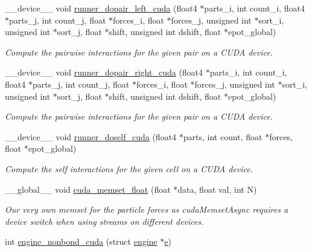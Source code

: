 \begin{DoxyCompactItemize}
\-\_\-\-\_\-device\-\_\-\-\_\- void \hyperlink{runner__cuda_8cu_ac0ad184f688f3a3b79c58f73f642b611}{runner\-\_\-dopair\-\_\-left\-\_\-cuda} (float4 $\ast$parts\-\_\-i, int count\-\_\-i, float4 $\ast$parts\-\_\-j, int count\-\_\-j, float $\ast$forces\-\_\-i, float $\ast$forces\-\_\-j, unsigned int $\ast$sort\-\_\-i, unsigned int $\ast$sort\-\_\-j, float $\ast$shift, unsigned int dshift, float $\ast$epot\-\_\-global)
\begin{DoxyCompactList}\small\item\em Compute the pairwise interactions for the given pair on a C\-U\-D\-A device. \end{DoxyCompactList}\item 
\-\_\-\-\_\-device\-\_\-\-\_\- void \hyperlink{runner__cuda_8cu_a3dd671b11851b775b5fef7b8ae178c9e}{runner\-\_\-dopair\-\_\-right\-\_\-cuda} (float4 $\ast$parts\-\_\-i, int count\-\_\-i, float4 $\ast$parts\-\_\-j, int count\-\_\-j, float $\ast$forces\-\_\-i, float $\ast$forces\-\_\-j, unsigned int $\ast$sort\-\_\-i, unsigned int $\ast$sort\-\_\-j, float $\ast$shift, unsigned int dshift, float $\ast$epot\-\_\-global)
\begin{DoxyCompactList}\small\item\em Compute the pairwise interactions for the given pair on a C\-U\-D\-A device. \end{DoxyCompactList}\item 
\-\_\-\-\_\-device\-\_\-\-\_\- void \hyperlink{runner__cuda_8cu_a1c924aa03f90fa43d741e4b95ac4f185}{runner\-\_\-doself\-\_\-cuda} (float4 $\ast$parts, int count, float $\ast$forces, float $\ast$epot\-\_\-global)
\begin{DoxyCompactList}\small\item\em Compute the self interactions for the given cell on a C\-U\-D\-A device. \end{DoxyCompactList}\item 
\-\_\-\-\_\-global\-\_\-\-\_\- void \hyperlink{runner__cuda_8cu_a3e3d193762e74ec5046ce21883c869ca}{cuda\-\_\-memset\-\_\-float} (float $\ast$data, float val, int N)
\begin{DoxyCompactList}\small\item\em Our very own memset for the particle forces as cuda\-Memset\-Async requires a device switch when using streams on different devices. \end{DoxyCompactList}\item 
int \hyperlink{runner__cuda_8cu_abdd3e423279f5335dea30af84aa539a1}{engine\-\_\-nonbond\-\_\-cuda} (struct \hyperlink{structengine}{engine} $\ast$\hyperlink{potential__eval_8h_ad93203f13cbfb07bd361e3b37b092fff}{e})

\end{DoxyCompactItemize}
